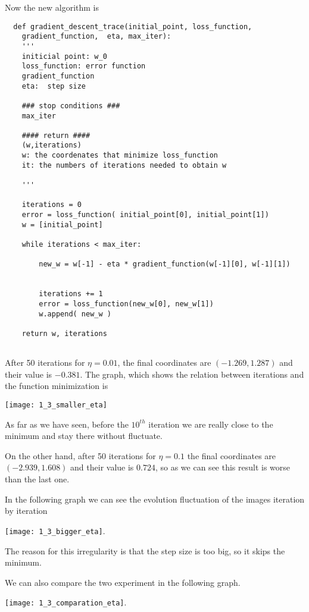 Now the new algorithm is
\begin{verbatim}
  def gradient_descent_trace(initial_point, loss_function,
    gradient_function,  eta, max_iter):
    '''
    initicial point: w_0 
    loss_function: error function 
    gradient_function
    eta:  step size 

    ### stop conditions ###
    max_iter

    #### return ####
    (w,iterations)
    w: the coordenates that minimize loss_function
    it: the numbers of iterations needed to obtain w
    
    '''

    iterations = 0
    error = loss_function( initial_point[0], initial_point[1])
    w = [initial_point]
  
    while iterations < max_iter: 

        new_w = w[-1] - eta * gradient_function(w[-1][0], w[-1][1])
        
        
        iterations += 1
        error = loss_function(new_w[0], new_w[1])
        w.append( new_w ) 
    
    return w, iterations
  
  \end{verbatim}


  After 50 iterations for  $\eta = 0.01$, the  final coordinates are $(-1.269, 1.287)$ and their value is $-0.381$. The graph, which shows the relation between iterations and the function minimization is


  \texttt{[image: 1\_3\_smaller\_eta]}

  As far as we have seen, before the $10^{th}$ iteration we are really close to  the minimum and stay there without fluctuate.

  On the other hand, after 50 iterations for  $\eta = 0.1$ the final coordinates are $(-2.939, 1.608)$ and their value is $0.724$, so as we can see this result is worse than the last one.

  In the following graph we can see the evolution fluctuation of the images iteration by iteration 

  \texttt{[image: 1\_3\_bigger\_eta]}.

 The reason for this irregularity  is that the step size is too big, so it skips the minimum.

 We can also  compare the two experiment in the following graph.
 
\texttt{[image: 1\_3\_comparation\_eta]}.


